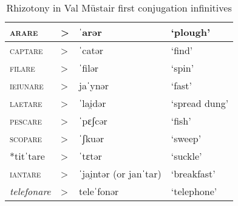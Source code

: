 \documentclass[output=paper,
modfonts
]{LSP/langsci}
\begin{document}
\begin{longtable}[]{@{}llll@{}}
\caption{Rhizotony in Val Müstair first conjugation infinitives}\\
\lsptoprule
\textsc{arare} & \textgreater{} & ˈarər & `plough'\tabularnewline
\midrule
\endhead
\textsc{captare} & \textgreater{} & ˈcatər & `find'\tabularnewline
\textsc{filare} & \textgreater{} & ˈfilər & `spin'\tabularnewline
\textsc{ieiunare} & \textgreater{} & jaˈynər & `fast'\tabularnewline
\textsc{laetare} & \textgreater{} & ˈlai̯dər & `spread
dung'\tabularnewline
\textsc{pescare} & \textgreater{} & ˈpɛʃcər & `fish'\tabularnewline
\textsc{scopare} & \textgreater{} & ˈʃkuər & `sweep'\tabularnewline
*titˈtare & \textgreater{} & ˈtɛtər & `suckle'\tabularnewline
\textsc{iantare} & \textgreater{} & ˈjai̯ntər (or janˈtar) &
`breakfast'\tabularnewline
\emph{telefonare} & \textgreater{} & teleˈfonər &
`telephone'\tabularnewline
\bottomrule
\end{longtable}
\end{document}
